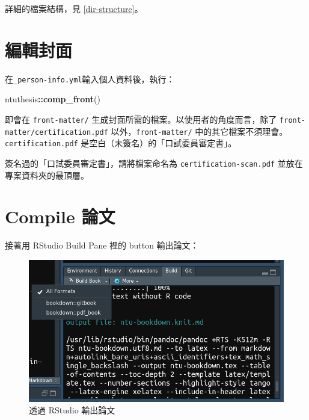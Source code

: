 \documentclass[oneside]{book}
\newenvironment{Shaded}{\begin{snugshade}}{\end{snugshade}}
\newcommand{\KeywordTok}[1]{\textcolor[rgb]{0.13,0.29,0.53}{\textbf{#1}}}
\newcommand{\OperatorTok}[1]{\textcolor[rgb]{0.81,0.36,0.00}{\textbf{#1}}}
\newcommand{\NormalTok}[1]{#1}
\theoremstyle{definition}
\theoremstyle{definition}
\theoremstyle{definition}
\theoremstyle{remark}
\begin{document}
詳細的檔案結構，見 \ref{dir-structure}。

\section{編輯封面}\label{edit-front-matter}

在\texttt{\_person-info.yml}輸入個人資料後，執行：

\begin{Shaded}
\begin{Highlighting}[]
\NormalTok{ntuthesis}\OperatorTok{::}\KeywordTok{comp_front}\NormalTok{()}
\end{Highlighting}
\end{Shaded}

即會在 \texttt{front-matter/}
生成封面所需的檔案。以使用者的角度而言，除了
\texttt{front-matter/certification.pdf} 以外，\texttt{front-matter/}
中的其它檔案不須理會。\texttt{certification.pdf}
是空白（未簽名）的「口試委員審定書」。

簽名過的「口試委員審定書」，請將檔案命名為
\texttt{certification-scan.pdf} 並放在專案資料夾的最頂層。

\section{Compile 論文}\label{compile-thesis}

接著用 RStudio Build Pane 裡的 button 輸出論文：

\begin{figure}[H]

{\centering \includegraphics[width=1\linewidth]{figs/build-button} 

}

\caption{透過 RStudio 輸出論文}\label{fig:unnamed-chunk-3}
\end{figure}
\end{document}
